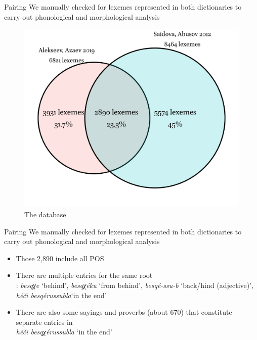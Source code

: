 \begin{frame}{Pairing}
We manually checked for lexemes represented in both dictionaries to carry out phonological and morphological analysis 
\begin{figure}[h]
\centering
\includegraphics[scale=0.45]{images/venn.png}
\caption{The database}
\end{figure}
\end{frame}

\begin{frame}{Pairing}
We manually checked for lexemes represented in both dictionaries to carry out phonological and morphological analysis 
\begin{itemize}
    \item Those 2,890 include all POS
    \item There are multiple entries for the same root \\
    \citet{alekseev2019}: \textit{besqχe} `behind',  \textit{besqχéku }`from behind', \textit{besqé-ssu-b} `back/hind (adjective)', \textit{héči besqérussubla}`in the end'
    \item There are also some sayings and proverbs (about 670) that constitute separate entries in \citet{alekseev2019}\\
    \textit{héči besqχérussubla}
    `in the end'
\end{itemize}
\end{frame}

